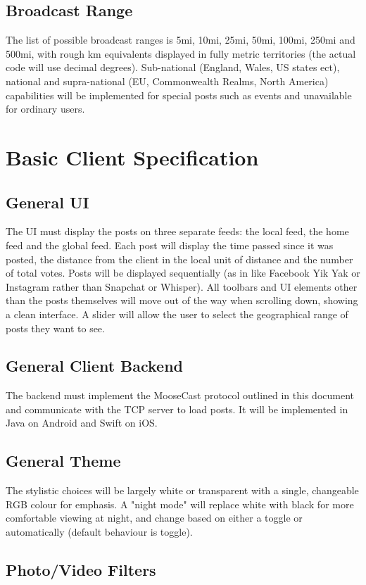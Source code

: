 \documentclass[12pt, a4paper]{article}
\begin{document}
\subsection{Broadcast Range}
The list of possible broadcast ranges is 5mi, 10mi, 25mi, 50mi, 100mi, 250mi and 500mi, with rough km equivalents displayed in fully metric territories (the actual code will use decimal degrees). Sub-national (England, Wales, US states ect), national and supra-national (EU, Commonwealth Realms, North America) capabilities will be implemented for special posts such as events and unavailable for ordinary users.  
\section{Basic Client Specification}
\subsection{General UI}
The UI must display the posts on three separate feeds: the local feed, the home feed and the global feed. Each post will display the time passed since it was posted, the distance from the client in the local unit of distance and the number of total votes. Posts will be displayed sequentially (as in like Facebook Yik Yak or Instagram rather than Snapchat or Whisper). All toolbars and UI elements other than the posts themselves will move out of the way when scrolling down, showing a clean interface. A slider will allow the user to select the geographical range of posts they want to see.
\subsection{General Client Backend}
The backend must implement the MooseCast protocol outlined in this document and communicate with the TCP server to load posts. It will be implemented in Java on Android and Swift on iOS.
\subsection{General Theme}
The stylistic choices will be largely white or transparent with a single, changeable RGB colour for emphasis. A "night mode" will replace white with black for more comfortable viewing at night, and change based on either a toggle or automatically (default behaviour is toggle).
\subsection{Photo/Video Filters}
\end{document}
